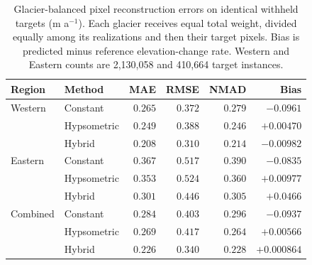 \begin{table}[!htbp]
\centering\small
\setlength{\tabcolsep}{5pt}
\caption{Glacier-balanced pixel reconstruction errors on identical withheld targets (m a$^{-1}$). Each glacier receives equal total weight, divided equally among its realizations and then their target pixels. Bias is predicted minus reference elevation-change rate. Western and Eastern counts are 2,130,058 and 410,664 target instances.}
\label{tab:pixel}
\begin{tabular}{llrrrr}
\toprule
Region & Method & MAE & RMSE & NMAD & Bias \\
\midrule
Western & Constant & $0.265$ & $0.372$ & $0.279$ & $-0.0961$ \\
 & Hypsometric & $0.249$ & $0.388$ & $0.246$ & {\boldmath$+0.00470$} \\
 & Hybrid & {\boldmath$0.208$} & {\boldmath$0.310$} & {\boldmath$0.214$} & $-0.00982$ \\
\midrule
Eastern & Constant & $0.367$ & $0.517$ & $0.390$ & $-0.0835$ \\
 & Hypsometric & $0.353$ & $0.524$ & $0.360$ & {\boldmath$+0.00977$} \\
 & Hybrid & {\boldmath$0.301$} & {\boldmath$0.446$} & {\boldmath$0.305$} & $+0.0466$ \\
\midrule
Combined & Constant & $0.284$ & $0.403$ & $0.296$ & $-0.0937$ \\
 & Hypsometric & $0.269$ & $0.417$ & $0.264$ & $+0.00566$ \\
 & Hybrid & {\boldmath$0.226$} & {\boldmath$0.340$} & {\boldmath$0.228$} & {\boldmath$+0.000864$} \\
\bottomrule
\end{tabular}
\end{table}
